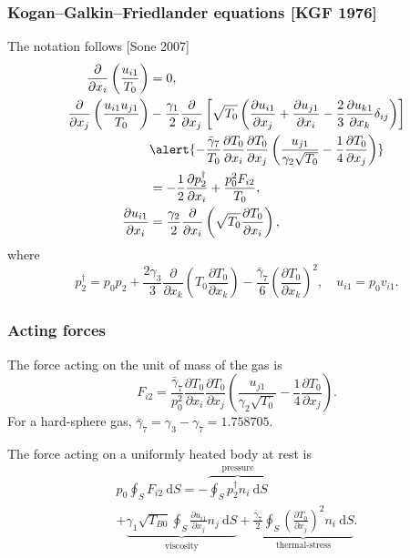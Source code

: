 \documentclass[mathserif]{beamer} %
\newcommand{\dd}{\:\mathrm{d}}
\newcommand{\pder}[2][]{\frac{\partial#1}{\partial#2}}
\begin{document}
\begin{frame}
    \frametitle{Kogan--Galkin--Friedlander equations [KGF 1976]}
    The notation follows [Sone 2007]
    \begin{align}
        \pder{x_i}\left(\frac{u_{i1}}{T_0}\right) &= 0, \label{eq:asymptotic1} \\
        \pder{x_j}\left(\frac{u_{i1}u_{j1}}{T_0}\right)
            &-\frac{\gamma_1}2\pder{x_j}\left[\sqrt{T_0}\left(
                \pder[u_{i1}]{x_j} + \pder[u_{j1}]{x_i} - \frac23\pder[u_{k1}]{x_k}\delta_{ij}
            \right)\right] \notag\\
            &\alert{- \frac{\bar{\gamma}_7}{T_0}\pder[T_0]{x_i}\pder[T_0]{x_j}
                \left(\frac{u_{j1}}{\gamma_2\sqrt{T_0}} - \frac{1}4\pder[T_0]{x_j}\right)} \notag\\
            &= -\frac12\pder[p_2^\dag]{x_i} + \frac{p_0^2 F_{i2}}{T_0}, \label{eq:asymptotic2} \\
        \pder[u_{i1}]{x_i} &= \frac{\gamma_2}2\pder{x_i}\left(\sqrt{T_0}\pder[T_0]{x_i}\right), \label{eq:asymptotic3}
    \end{align}
    where
    \begin{equation}\label{eq:dag_pressure}
        p_2^\dag = p_0 p_2
            + \frac{2\gamma_3}{3}\pder{x_k}\left(T_0\pder[T_0]{x_k}\right)
            - \frac{\bar{\gamma}_7}{6}\left(\pder[T_0]{x_k}\right)^2, \quad u_{i1} = p_0v_{i1}.
    \end{equation}
\end{frame}

\begin{frame}
    \frametitle{Acting forces}
    The force acting on the unit of mass of the gas is
    \begin{equation}\label{eq:gamma7_force}
        F_{i2} = \frac{\bar{\gamma}_7}{p_0^2}\pder[T_0]{x_i}\pder[T_0]{x_j}\left(\frac{u_{j1}}{\gamma_2\sqrt{T_0}}
            - \frac{1}4\pder[T_0]{x_j}\right).
    \end{equation}
    For a hard-sphere gas, \(\bar{\gamma}_7 = \gamma_3 - \gamma_7 = 1.758705\).
    \vspace{20pt}\pause

    The force acting on a uniformly heated body at rest is
    \begin{multline}\label{eq:force:terms}
        p_0 \oint_S F_{i2} \dd{S} =
            - \overbrace{ \oint_S p_2^\dag n_i \dd{S} }^\text{pressure} \\
            + \underbrace{ \gamma_1 \sqrt{T_{B0}} \oint_S \pder[u_{i1}]{x_j} n_j \dd{S} }_\text{viscosity}
            + \underbrace{ \frac{\bar{\gamma}_7}{2} \oint_S \left(\pder[T_0]{x_j}\right)^2 n_i \dd{S} }_\text{thermal-stress}.
    \end{multline}
\end{frame}
\end{document}
